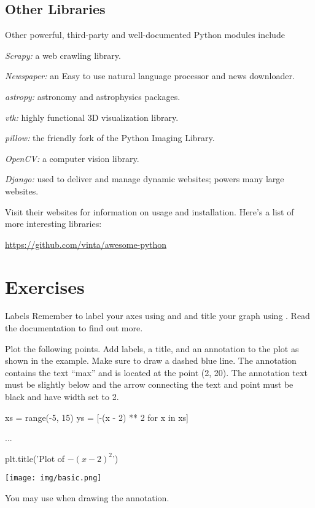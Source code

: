 \documentclass[11pt]{cselabheader}
\begin{document}
\subsection{Other Libraries}
Other powerful, third-party and well-documented Python modules include
\begin{inparaenum}
\item \textsl{Scrapy:} a web crawling library.
\item \textsl{Newspaper:} an Easy to use natural language processor and news downloader.
\item \textsl{astropy:} astronomy and astrophysics packages.
\item \textsl{vtk:} highly functional 3D visualization library.
\item \textsl{pillow:} the friendly fork of the Python Imaging Library.
\item \textsl{OpenCV:} a computer vision library.
\item \textsl{Django:} used to deliver and manage dynamic websites; powers many large websites.
\end{inparaenum}

Visit their websites for information on usage and installation.
Here's a list of more interesting libraries:
\begin{center}
\url{https://github.com/vinta/awesome-python}
\end{center}

\newpage
\section{Exercises}\label{exercises}

\begin{warningbox}{Labels}
  Remember to label your axes using
   and 
  and title your graph
  using . Read the documentation to
  find out more.
\end{warningbox}

\begin{ex}[plotpoints.py] 
Plot the following points. Add labels, a title, and an annotation to the plot
as shown in the example. Make sure to draw a dashed blue line.
The annotation contains the text ``max'' and is located at the point (2, 20).
The annotation text must be slightly below and the arrow connecting the text
and point must be black and have width set to 2.

\begin{python3code}
xs = range(-5, 15)
ys = [-(x - 2) ** 2 for x in xs]

...

plt.title('Plot of $-(x - 2)^2$')
\end{python3code}

\begin{center}
\texttt{[image: img/basic.png]}
\end{center}

You may use 
when drawing the annotation.
\end{ex}
\end{document}
